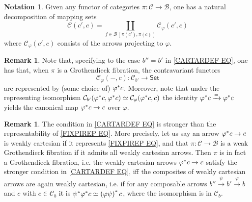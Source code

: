 \documentclass[a4paper,10pt
,draft
]{article}%
\numberwithin{equation}{section}
\numberwithin{figure}{section}
\theoremstyle{definition} %
\newtheorem{remark}[equation]{Remark}%
\newtheorem{notation}[equation]{Notation}%
\newcommand{\1}{\ensuremath{\mathbbm 1}}%
\begin{document}
\begin{notation}\label{MAPSDEC NOT}
Given any functor of categories
$\pi \colon \mathcal{C} \to \mathcal{B}$,
one has a natural decomposition of mapping sets
\begin{equation}
\mathcal{C}(c',c) = 
\coprod_{f \in \mathcal{B}(\pi(c'),\pi(c))}
 \mathcal{C}_{\varphi}\left(c',c \right)
\end{equation}
where $\mathcal{C}_{\varphi}\left(c',c \right)$ consists of the arrows projecting to $\varphi$.
\end{notation}



\begin{remark}\label{CARTCHAR REM}
Note that, specifying to the case $b'' = b'$ in 
\eqref{CARTARDEF EQ},
one has that,
when $\pi$ is a Grothendieck fibration, the contravariant functors
\begin{equation}\label{FIXPIREP EQ}
\mathcal{C}_{\varphi}(-,c)
\colon
\mathcal{C}_{b'} 
\to
\mathsf{Set}
\end{equation}
are represented by (some choice of) $\varphi^{\**}c$.
Moreover, note that under the representing isomorphism
$\mathcal{C}_{b'}(\varphi^{\**}c,\varphi^{\**}c)
\simeq \mathcal{C}_{\varphi}(\varphi^{\**}c,c)$
the identity
$\varphi^{\**}c \xrightarrow{=} \varphi^{\**}c$
yields the canonical map
$\varphi^{\**}c \to c$ over $\varphi$.
\end{remark}


\begin{remark}\label{COMPSEMI REM}
The condition in \eqref{CARTARDEF EQ}
is stronger than the representability of 
\eqref{FIXPIREP EQ}.
More precisely, let us say an arrow 
$\varphi^{\**}c \to c$
is weakly cartesian if it represents \eqref{FIXPIREP EQ},
and that  
$\pi \colon \mathcal{C} \to \mathcal{B}$
is a weak Grothendieck fibration if it admits all weakly cartesian arrows.
Then $\pi$ is in fact a Grothendieck fibration,
i.e. the weakly cartesian arrows 
$\varphi^{\**}c \to c$
satisfy the stronger condition in \eqref{CARTARDEF EQ},
iff the composites of weakly cartesian arrows are again weakly cartesian, 
i.e. if 
for any composable arrows
$b'' \xrightarrow{\psi} b' \xrightarrow{\varphi} b$
and $c$ with $c \in \mathcal{C}_b$ it is
$\psi^{\**} \varphi^{\**} c \simeq 
\left( \varphi \psi \right)^{\**} c$,
where the isomorphism is in $\mathcal{C}_b$.
\end{remark}
\end{document}
